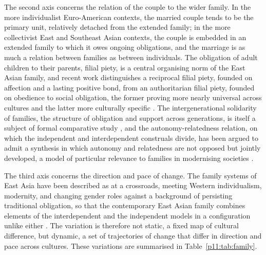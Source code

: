 The second axis concerns the relation of the couple to the wider family. In the more individualist Euro-American contexts, the married couple tends to be the primary unit, relatively detached from the extended family; in the more collectivist East and Southeast Asian contexts, the couple is embedded in an extended family to which it owes ongoing obligations, and the marriage is as much a relation between families as between individuals. The obligation of adult children to their parents, filial piety, is a central organising norm of the East Asian family, and recent work distinguishes a reciprocal filial piety, founded on affection and a lasting positive bond, from an authoritarian filial piety, founded on obedience to social obligation, the former proving more nearly universal across cultures and the latter more culturally specific \parencite{yeh2013}. The intergenerational solidarity of families, the structure of obligation and support across generations, is itself a subject of formal comparative study \parencite{bengtson1991}, and the autonomy-relatedness relation, on which the independent and interdependent construals divide, has been argued to admit a synthesis in which autonomy and relatedness are not opposed but jointly developed, a model of particular relevance to families in modernising societies \parencite{kagitcibasi2005}.

The third axis concerns the direction and pace of change. The family systems of East Asia have been described as at a crossroads, meeting Western individualism, modernity, and changing gender roles against a background of persisting traditional obligation, so that the contemporary East Asian family combines elements of the interdependent and the independent models in a configuration unlike either \parencite{ji2015}. The variation is therefore not static, a fixed map of cultural difference, but dynamic, a set of trajectories of change that differ in direction and pace across cultures. These variations are summarised in Table~\ref{p11:tab:family}.

